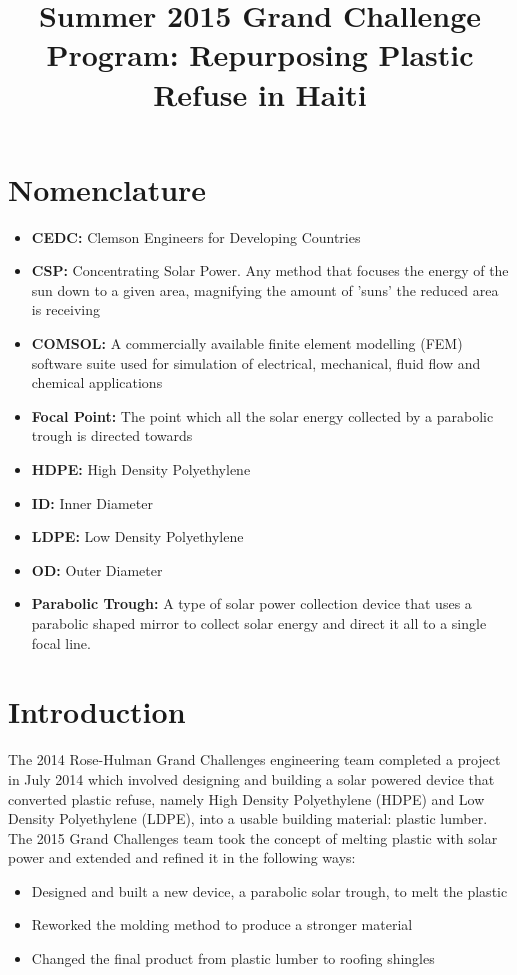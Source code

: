 \documentclass[11pt,english]{article}
\title{Summer 2015 Grand Challenge Program:
Repurposing Plastic Refuse in Haiti
}
{ \author{
 \textbf{ \footnotesize Falk, Jared}\\\textit{\footnotesize Project Manager}\\
  \texttt{\footnotesize falkja@rose-hulman.edu}\\
   \and
  \textbf{\footnotesize Housman, Stephen}\\\textit{\footnotesize Lead Researcher}\\
  \texttt{\footnotesize housmasd@rose-hulman.edu}
  \and\\
 \textbf{\footnotesize  Lawton, Steven}\\\textit{\footnotesize Lead Speaker}\\
  \texttt{\footnotesize lawtons@rose-hulman.edu}
  \and\\
 \textbf{\footnotesize Mathews, Leigh}\\\textit{\footnotesize Lead Writer}\\
  \texttt{\footnotesize mathewla@rose-hulman.edu}
  \and\\
 \textbf{\footnotesize  Schenck, Christopher}\\\textit{\footnotesize  Lead Constructor}\\
  \texttt{\footnotesize schenccj@rose-hulman.edu}
  \and\\
  \textbf{\footnotesize  Valioulis, Dimitris}\\\textit{\footnotesize  Customer Liaison}\\
  \texttt{\footnotesize valioud@rose-hulman.edu}
}}
\date{}
\begin{document}
\maketitle
\newpage
\tableofcontents


\newpage
\section{Nomenclature}
\begin{itemize}
\item \textbf{CEDC:} Clemson Engineers for Developing Countries
\item \textbf{CSP:} Concentrating Solar Power. Any method that focuses 
the energy of the sun down to a given area, magnifying the amount of 'suns' the reduced area is receiving
\item \textbf{COMSOL:} A commercially available finite element modelling (FEM) software suite used for  simulation of electrical, mechanical, fluid flow and chemical applications
\item \textbf{Focal Point:} The point which all the solar energy collected by a parabolic trough is directed towards
\item \textbf{HDPE:} High Density Polyethylene
\item \textbf{ID:} Inner Diameter
\item \textbf{LDPE:} Low Density Polyethylene
\item \textbf{OD:} Outer Diameter
\item \textbf{Parabolic Trough:} A type of solar power collection device that uses a parabolic shaped mirror to collect solar energy and direct it all to a single focal line.





\end{itemize}



\newpage
\section{Introduction}
The 2014 Rose-Hulman Grand Challenges engineering team completed a project in July 2014 which involved designing and building a solar powered device that converted plastic refuse, namely High Density Polyethylene (HDPE) and Low Density Polyethylene (LDPE), into a usable building material: plastic lumber. The 2015 Grand Challenges team took the concept of melting plastic with solar power and extended and refined it in the following ways: 
\begin{itemize}
\item Designed and built a new device, a parabolic solar trough, to melt the plastic
\item Reworked the molding method to produce a stronger material
\item Changed the final product from plastic lumber to roofing shingles
\end{itemize} 
\end{document}
